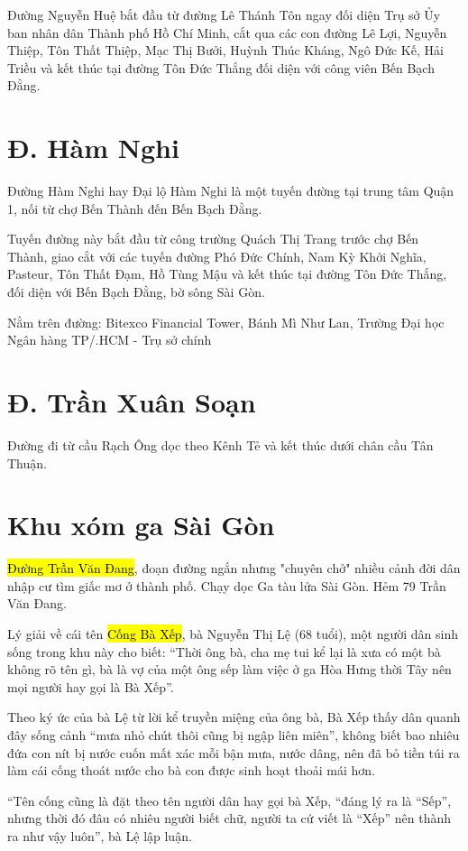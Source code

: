 Đường Nguyễn Huệ bắt đầu từ đường Lê Thánh Tôn ngay đối diện Trụ sở Ủy ban nhân dân Thành phố Hồ Chí Minh, cắt qua các con đường Lê Lợi, Nguyễn Thiệp, Tôn Thất Thiệp, Mạc Thị Bưởi, Huỳnh Thúc Kháng, Ngô Đức Kế, Hải Triều và kết thúc tại đường Tôn Đức Thắng đối diện với công viên Bến Bạch Đằng.

\section{Đ. Hàm Nghi}

Đường Hàm Nghi hay Đại lộ Hàm Nghi là một tuyến đường tại trung tâm Quận 1, nối từ chợ Bến Thành đến Bến Bạch Đằng.

Tuyến đường này bắt đầu từ công trường Quách Thị Trang trước chợ Bến Thành, giao cắt với các tuyến đường Phó Đức Chính, Nam Kỳ Khởi Nghĩa, Pasteur, Tôn Thất Đạm, Hồ Tùng Mậu và kết thúc tại đường Tôn Đức Thắng, đối diện với Bến Bạch Đằng, bờ sông Sài Gòn.

Nằm trên đường: Bitexco Financial Tower, Bánh Mì Như Lan, Trường Đại học Ngân hàng TP/.HCM - Trụ sở chính

\section{Đ. Trần Xuân Soạn}

Đường đi từ cầu Rạch Ông dọc theo Kênh Tẻ và kết thúc dưới chân cầu Tân Thuận.

\section{Khu xóm ga Sài Gòn}

\hl{Đường Trần Văn Đang}, đoạn đường ngắn nhưng "chuyên chở" nhiều cảnh đời dân nhập cư tìm giấc mơ ở thành phố. Chạy dọc Ga tàu lửa Sài Gòn. Hẻm 79 Trần Văn Đang.

Lý giải về cái tên \hl{Cống Bà Xếp}, bà Nguyễn Thị Lệ (68 tuổi), một người dân sinh sống trong khu này cho biết: “Thời ông bà, cha mẹ tui kể lại là xưa có một bà không rõ tên gì, bà là vợ của một ông sếp làm việc ở ga Hòa Hưng thời Tây nên mọi người hay gọi là Bà Xếp”.

Theo ký ức của bà Lệ từ lời kể truyền miệng của ông bà, Bà Xếp thấy dân quanh đây sống cảnh “mưa nhỏ chút thôi cũng bị ngập liên miên”, không biết bao nhiêu đứa con nít bị nước cuốn mất xác mỗi bận mưa, nước dâng, nên đã bỏ tiền túi ra làm cái cống thoát nước cho bà con được sinh hoạt thoải mái hơn.

“Tên cống cũng là đặt theo tên người dân hay gọi bà Xếp, “đáng lý ra là “Sếp”, nhưng thời đó đâu có nhiêu người biết chữ, người ta cứ viết là “Xếp” nên thành ra như vậy luôn”, bà Lệ lập luận.

